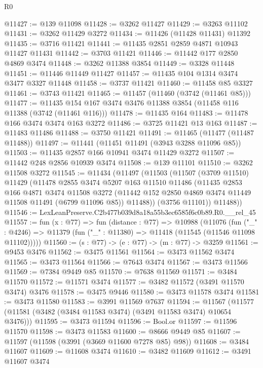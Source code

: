\begin{lexlean}{R0}
\begin{coremodule}
@11427 := @139 @11098
@11428 := @3262 @11427
@11429 := @3263 @11102
@11431 := @3262 @11429 @3272
@11434 := @11426 (@11428 @11431) @11392
@11435 := @3716 @11421
@11441 := @11435 @2851 @2859 @4871 @10943 @11427 @11431
@11442 := @3703 @11421
@11446 := @11442 @177 @2850 @4869 @3474
@11448 := @3262 @11388 @3854
@11449 := @3328 @11448
@11451 := @11446 @11449 @11427
@11457 := @11435 @104 @1314 @3474 @3477 @3327 @11448
@11458 := @3737 @11421
@11460 := @11458 @85 @3327
@11461 := @3743 @11421
@11465 := @11457 (@11460 (@3742 (@11461 @85)))
@11477 := @11435 @154 @167 @3474 @3476 @11388 @3854 (@11458 @116 @11388 (@3742 (@11461 @116)))
@11478 := @11435 @164
@11483 := @11478 @166 @3474 @3474 @163 @3272
@11486 := @3725 @11421 @13 @163
@11487 := @11483 @11486
@11488 := @3750 @11421
@11491 := @11465 (@11477 (@11487 @11488))
@11497 := @11441 (@11451 @11491 (@3943 @3288 @11096 @85))
@11503 := @11435 @2857 @166 @10941 @3474 @11429 @3272
@11507 := @11442 @248 @2856 @10939 @3474
@11508 := @139 @11101
@11510 := @3262 @11508 @3272
@11545 := @11434
    (@11497
      (@11503
        (@11507
          (@3709 @11510)
          @11429
          (@11478
            @2855
            @3474
            @5207
            @163
            @11510
            @11486
            (@11435
              @2853
              @166
              @4871
              @3474
              @11508
              @3272
              (@11442 @152 @2850 @4869 @3474 @11449 @11508 @11491 (@6799 @11096 @85))
              @11488))
          (@3756 @11101))
        @11488))
@11546 := LexLeanPreserve.C2b477b039d8a18a55b3ec6585f6c0b89.R0.__rel_45
@11557 := fun (x : @77) =>
  fun (distance : @77) =>
  @10988
    (@11076
      (fun ("_" : @4246) => @11379 (fun ("_" : @11380) => @11418 (@11545 (@11546 @11098 @11102)))))
@11560 := (s : @77) -> (e : @77) -> (m : @77) -> @3259
@11561 := @9453 @3476
@11562 := @3475 @11561
@11564 := @3473 @11562 @3474
@11565 := @3473 @11564
@11566 := @7643 @3474
@11567 := @3473 @11566
@11569 := @7384 @9449 @85
@11570 := @7638 @11569
@11571 := @3484 @11570
@11572 := @11571 @3474
@11577 := @3482 @11572 (@3491 @11570 @3474) @3476
@11578 := @3475 @9446
@11580 := @3473 @11578 @3474
@11581 := @3473 @11580
@11583 := @3991 @11569 @7637
@11594 := @11567 (@11577 (@11581 (@3482 (@3484 @11583 @3474) (@3491 @11583 @3474) @10654 @3476)))
@11595 := @3473 @11594
@11596 := Bool.or
@11597 := @11596 @11570
@11598 := @3473 @11583
@11600 := @8666 @9449 @85
@11607 := @11597 (@11598 (@3991 (@3669 @11600 @7278 @85) @98))
@11608 := @3484 @11607
@11609 := @11608 @3474
@11610 := @3482 @11609
@11612 := @3491 @11607 @3474

\end{coremodule}
\end{lexlean}
